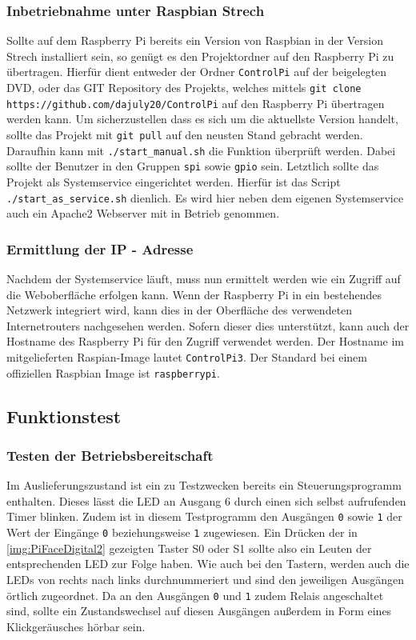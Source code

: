  \subsubsection{Inbetriebnahme unter Raspbian Strech}
 Sollte auf dem Raspberry Pi bereits ein Version von Raspbian in der Version Strech installiert sein, so genügt es den Projektordner auf den Raspberry Pi zu übertragen. Hierfür dient entweder der Ordner \texttt{ControlPi} auf der beigelegten DVD, oder das GIT Repository des Projekts, welches mittels  \texttt{git clone https://github.com/dajuly20/ControlPi} auf den Raspberry Pi übertragen werden kann. Um sicherzustellen dass es sich um die aktuellste Version handelt, sollte das Projekt mit \texttt{git pull} auf den neusten Stand gebracht werden. Daraufhin kann mit \texttt{./start\_manual.sh} die Funktion überprüft werden. Dabei sollte der Benutzer in den Gruppen \texttt{spi} sowie \texttt{gpio} sein. Letztlich sollte das Projekt als Systemservice eingerichtet werden. Hierfür ist das Script \texttt{./start\_as\_service.sh} dienlich. Es wird hier neben dem eigenen Systemservice auch ein Apache2 Webserver mit in Betrieb genommen.
 \subsubsection{Ermittlung der IP - Adresse}\label{chp:ausw:ip}
 Nachdem der Systemservice läuft, muss nun ermittelt werden wie ein Zugriff auf die Weboberfläche erfolgen kann. Wenn der Raspberry Pi in ein bestehendes Netzwerk integriert wird, kann dies in der Oberfläche des verwendeten Internetrouters nachgesehen werden. Sofern dieser dies unterstützt, kann auch der Hostname des Raspberry Pi für den Zugriff verwendet werden. Der Hostname im mitgelieferten Raspian-Image lautet \texttt{ControlPi3}. Der Standard bei einem offiziellen Raspbian Image ist \texttt{raspberrypi}. 
 \subsection{Funktionstest}
 \subsubsection{Testen der Betriebsbereitschaft}
 Im Auslieferungszustand ist ein zu Testzwecken bereits ein Steuerungsprogramm enthalten. Dieses lässt die LED an Ausgang 6 durch einen sich selbst aufrufenden Timer blinken. Zudem ist in diesem Testprogramm den Ausgängen \texttt{0} sowie \texttt{1} der Wert der Eingänge \texttt{0} beziehungsweise \texttt{1} zugewiesen. Ein Drücken der in \autoref{img:PiFaceDigital2} gezeigten Taster S0 oder S1 sollte also ein Leuten der entsprechenden LED zur Folge haben. Wie auch bei den Tastern, werden auch die LEDs von rechts nach links durchnummeriert und sind den jeweiligen Ausgängen örtlich zugeordnet. Da an den Ausgängen \texttt{0} und \texttt{1} zudem Relais angeschaltet sind, sollte ein Zustandswechsel auf diesen Ausgängen außerdem in Form eines Klickgeräusches hörbar sein. 

